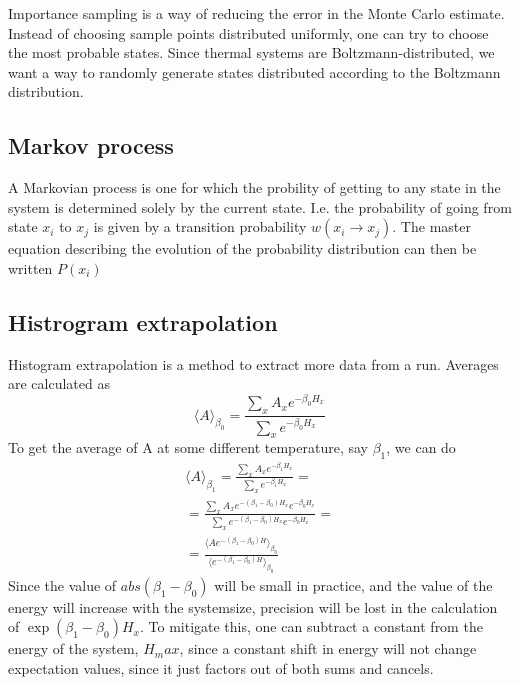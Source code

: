 \documentclass[a4paper]{article}
\begin{document}
 Importance sampling is a way of reducing the error in the Monte Carlo estimate. Instead of choosing sample points distributed uniformly, one can try to choose the most probable states. Since thermal systems are Boltzmann-distributed, we want a way to randomly generate states distributed according to the Boltzmann distribution.
\subsection{Markov process}
A Markovian process is one for which the probility of getting to any state in the system is determined solely by the current state. I.e. the probability of going from state $x_i$ to $x_{j}$ is given by a transition probability $w(x_i \rightarrow x_j)$. The master equation describing the evolution of the probability distribution can then be written $P(x_i )$
 


\subsection{Histrogram extrapolation}
Histogram extrapolation is a method to extract more data from a run. 
Averages are calculated as
\begin{equation}
  \langle A \rangle_{\beta_0} =  \frac{\sum_{x}A_x e^{-\beta_0 H_x}}{\sum_{x}e^{-\beta_0 H_x}}
\end{equation}
To get the average of A at some different temperature, say $\beta_1$, we can do
\begin{align}
  \langle A\rangle_{\beta_1} =  \frac{\sum_{x}A_x e^{-\beta_1 H_x}}{\sum_{x}e^{-\beta_1 H_x}} = \\
  = \frac{\sum_x A_x e^{-(\beta_1 - \beta_0)H_x} e^{-\beta_0 H_x}}{\sum_x e^{-(\beta_1 - \beta_0)H_x}e^{-\beta_0 H_x}} = \\
  = \frac{\langle A e^{-(\beta_1 - \beta_0)H}\rangle_{\beta_0}}{\langle e^{-(\beta_1 - \beta_0)H}\rangle_{\beta_0}}
\end{align}
Since the value of $abs(\beta_1 -\beta_0)$ will be small in practice, and the value of the energy will increase with the systemsize, precision will be lost in the calculation of $\exp\left( \beta_1 - \beta_0 \right)H_x$. To mitigate this, one can subtract a constant from the energy of the system, $H_max$, since a constant shift in energy will not change expectation values, since it just factors out of both sums and cancels.
\end{document}
